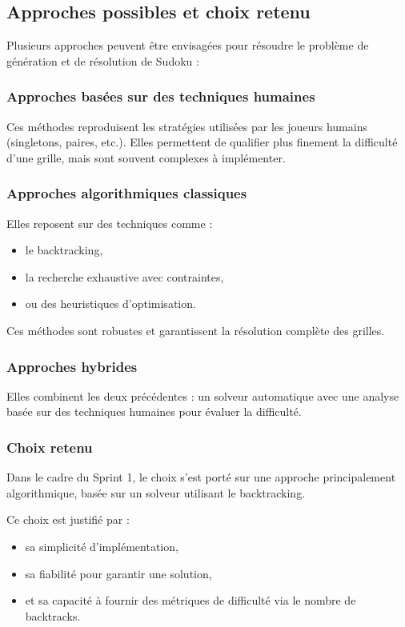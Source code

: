 \documentclass[a4paper]{article}
\begin{document}
\subsection{Approches possibles et choix retenu}

Plusieurs approches peuvent être envisagées pour résoudre le problème de génération et de résolution de Sudoku :

\subsubsection{Approches basées sur des techniques humaines}

Ces méthodes reproduisent les stratégies utilisées par les joueurs humains (singletons, paires, etc.). Elles permettent de qualifier plus finement la difficulté d’une grille, mais sont souvent complexes à implémenter.

\subsubsection{Approches algorithmiques classiques}

Elles reposent sur des techniques comme :
\begin{itemize}
    \item le backtracking,
    \item la recherche exhaustive avec contraintes,
    \item ou des heuristiques d’optimisation.
\end{itemize}

Ces méthodes sont robustes et garantissent la résolution complète des grilles.

\subsubsection{Approches hybrides}

Elles combinent les deux précédentes : un solveur automatique avec une analyse basée sur des techniques humaines pour évaluer la difficulté.

\subsubsection*{Choix retenu}

Dans le cadre du Sprint 1, le choix s’est porté sur une approche principalement algorithmique, basée sur un solveur utilisant le backtracking.

Ce choix est justifié par :
\begin{itemize}
    \item sa simplicité d’implémentation,
    \item sa fiabilité pour garantir une solution,
    \item et sa capacité à fournir des métriques de difficulté via le nombre de backtracks.
\end{itemize}
\end{document}
